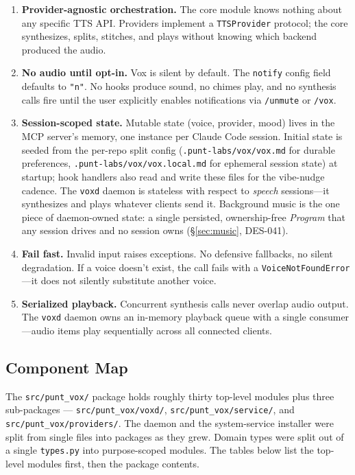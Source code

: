 \documentclass[a4paper,10pt]{article}
\newcommand{\modpath}[1]{\texttt{src/punt\_vox/#1}}
\newcommand{\field}[1]{\texttt{#1}}
\newcommand{\cmd}[1]{\texttt{/#1}}
\begin{document}
\begin{enumerate}[label=\textbf{P\arabic*}.]
  \item \textbf{Provider-agnostic orchestration.}  The core module
    knows nothing about any specific TTS API.  Providers implement
    a \texttt{TTSProvider} protocol; the core synthesizes, splits,
    stitches, and plays without knowing which backend produced the
    audio.
  \item \textbf{No audio until opt-in.}  Vox is silent by default.
    The \field{notify} config field defaults to \texttt{"n"}.  No
    hooks produce sound, no chimes play, and no synthesis calls fire
    until the user explicitly enables notifications via \cmd{unmute}
    or \cmd{vox}.
  \item \textbf{Session-scoped state.}  Mutable state (voice,
    provider, mood) lives in the MCP server's memory, one instance
    per Claude Code session.  Initial state is seeded from the
    per-repo split config (\texttt{.punt-labs/vox/vox.md} for durable
    preferences, \texttt{.punt-labs/vox/vox.local.md} for ephemeral
    session state) at startup; hook handlers also read and write these
    files for the vibe-nudge cadence.  The \texttt{voxd} daemon
    is stateless with respect to \emph{speech} sessions---it synthesizes
    and plays whatever clients send it.  Background music is the one
    piece of daemon-owned state: a single persisted, ownership-free
    \emph{Program} that any session drives and no session owns
    (\S\ref{sec:music}, DES-041).
  \item \textbf{Fail fast.}  Invalid input raises exceptions.
    No defensive fallbacks, no silent degradation.  If a voice
    doesn't exist, the call fails with a
    \texttt{VoiceNotFoundError}---it does not silently substitute
    another voice.
  \item \textbf{Serialized playback.}  Concurrent synthesis calls
    never overlap audio output.  The \texttt{voxd} daemon owns an
    in-memory playback queue with a single consumer---audio items
    play sequentially across all connected clients.
\end{enumerate}

\subsection{Component Map}

The \texttt{src/punt\_vox/} package holds roughly thirty top-level
modules plus three sub-packages --- \modpath{voxd/},
\modpath{service/}, and \modpath{providers/}.  The daemon and the
system-service installer were split from single files into packages
as they grew.  Domain types were split out of a single
\texttt{types.py} into purpose-scoped modules.  The tables below list
the top-level modules first, then the package contents.
\end{document}
